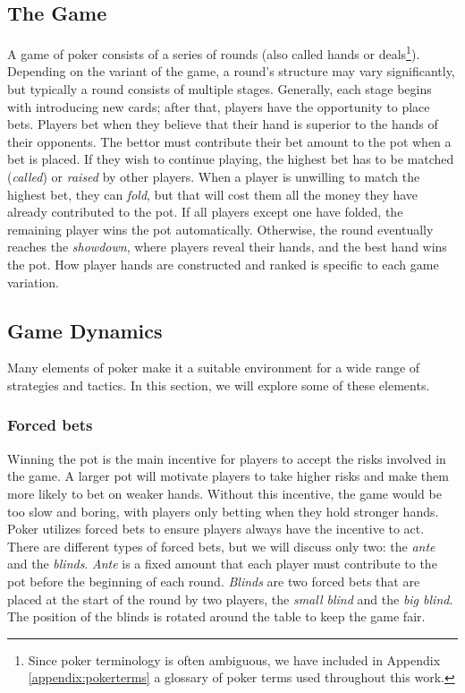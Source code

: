 \subsection{The Game}
\label{sec:poker-game}
A game of poker consists of a series of rounds (also called hands or deals\footnote{Since poker terminology is often ambiguous, we have included in Appendix \ref{appendix:pokerterms} a glossary of poker terms used throughout this work.}). Depending on the variant of the game, a round's structure may vary significantly, but typically a round consists of multiple stages. Generally, each stage begins with introducing new cards; after that, players have the opportunity to place bets. Players bet when they believe that their hand is superior to the hands of their opponents. The bettor must contribute their bet amount to the pot when a bet is placed. If they wish to continue playing, the highest bet has to be matched (\textit{called}) or \textit{raised} by other players. When a player is unwilling to match the highest bet, they can \textit{fold}, but that will cost them all the money they have already contributed to the pot. If all players except one have folded, the remaining player wins the pot automatically. Otherwise, the round eventually reaches the \textit{showdown}, where players reveal their hands, and the best hand wins the pot. How player hands are constructed and ranked is specific to each game variation.

\subsection{Game Dynamics}
Many elements of poker make it a suitable environment for a wide range of strategies and tactics. In this section, we will explore some of these elements.

\subsubsection{Forced bets}
Winning the pot is the main incentive for players to accept the risks involved in the game. A larger pot will motivate players to take higher risks and make them more likely to bet on weaker hands. Without this incentive, the game would be too slow and boring, with players only betting when they hold stronger hands. Poker utilizes forced bets to ensure players always have the incentive to act. There are different types of forced bets, but we will discuss only two: the \textit{ante} and the \textit{blinds}. \textit{Ante} is a fixed amount that each player must contribute to the pot before the beginning of each round. \textit{Blinds} are two forced bets that are placed at the start of the round by two players, the \textit{small blind} and the \textit{big blind}. The position of the blinds is rotated around the table to keep the game fair.



